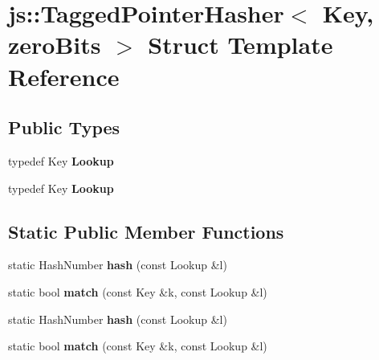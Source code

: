 \hypertarget{structjs_1_1_tagged_pointer_hasher}{\section{js\-:\-:Tagged\-Pointer\-Hasher$<$ Key, zero\-Bits $>$ Struct Template Reference}
\label{structjs_1_1_tagged_pointer_hasher}
}
\subsection*{Public Types}
\begin{DoxyCompactItemize}
\item 
\hypertarget{structjs_1_1_tagged_pointer_hasher_a3b381d1d092b8b3ed3aa23e8551cf915}{typedef Key {\bfseries Lookup}}\label{structjs_1_1_tagged_pointer_hasher_a3b381d1d092b8b3ed3aa23e8551cf915}

\item 
\hypertarget{structjs_1_1_tagged_pointer_hasher_a3b381d1d092b8b3ed3aa23e8551cf915}{typedef Key {\bfseries Lookup}}\label{structjs_1_1_tagged_pointer_hasher_a3b381d1d092b8b3ed3aa23e8551cf915}

\end{DoxyCompactItemize}
\subsection*{Static Public Member Functions}
\begin{DoxyCompactItemize}
\item 
\hypertarget{structjs_1_1_tagged_pointer_hasher_a789b0d0231dd8b87bc7097756c7239cc}{static Hash\-Number {\bfseries hash} (const Lookup \&l)}\label{structjs_1_1_tagged_pointer_hasher_a789b0d0231dd8b87bc7097756c7239cc}

\item 
\hypertarget{structjs_1_1_tagged_pointer_hasher_a8ea0148de8f0817d27336d252a461bb2}{static bool {\bfseries match} (const Key \&k, const Lookup \&l)}\label{structjs_1_1_tagged_pointer_hasher_a8ea0148de8f0817d27336d252a461bb2}

\item 
\hypertarget{structjs_1_1_tagged_pointer_hasher_a789b0d0231dd8b87bc7097756c7239cc}{static Hash\-Number {\bfseries hash} (const Lookup \&l)}\label{structjs_1_1_tagged_pointer_hasher_a789b0d0231dd8b87bc7097756c7239cc}

\item 
\hypertarget{structjs_1_1_tagged_pointer_hasher_a8ea0148de8f0817d27336d252a461bb2}{static bool {\bfseries match} (const Key \&k, const Lookup \&l)}\label{structjs_1_1_tagged_pointer_hasher_a8ea0148de8f0817d27336d252a461bb2}

\end{DoxyCompactItemize}
